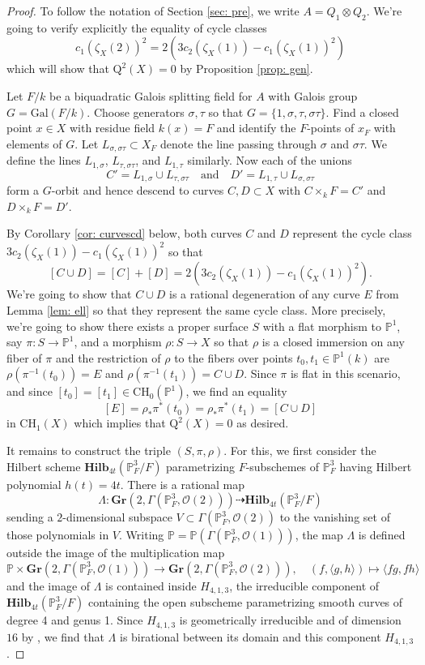 \documentclass[12pt]{amsart}
\theoremstyle{definition}
\newcommand{\CH}{\mathrm{CH}}
\newcommand{\Q}{\mathrm{Q}}
\newcommand{\Hilb}{\mathbf{Hilb}}
\begin{document}
\begin{proof}
To follow the notation of Section \ref{sec: pre}, we write $A=Q_1\otimes Q_2$. We're going to verify explicitly the equality of cycle classes \[c_1(\zeta_X(2))^2=2(3c_2(\zeta_X(1))-c_1(\zeta_X(1))^2)\] which will show that $\Q^2(X)=0$ by Proposition \ref{prop: gen}.

Let $F/k$ be a biquadratic Galois splitting field for $A$ with Galois group $G=\mathrm{Gal}(F/k)$. Choose generators $\sigma,\tau$ so that $G=\{1,\sigma,\tau,\sigma\tau\}$. Find a closed point $x\in X$ with residue field $k(x)=F$ and identify the $F$-points of $x_F$ with elements of $G$. Let $L_{\sigma,\sigma\tau}\subset X_F$ denote the line passing through $\sigma$ and $\sigma\tau$. We define the lines $L_{1,\sigma}$, $L_{\tau,\sigma\tau}$, and $L_{1,\tau}$ similarly. Now each of the unions \[ C'=L_{1,\sigma}\cup L_{\tau,\sigma\tau} \quad \mbox{and}\quad D'=L_{1,\tau}\cup L_{\sigma,\sigma\tau}\] form a $G$-orbit and hence descend to curves $C,D\subset X$ with $C\times_k F=C'$ and $D\times_k F=D'$.

By Corollary \ref{cor: curvescd} below, both curves $C$ and $D$ represent the cycle class $3c_2(\zeta_X(1))-c_1(\zeta_X(1))^2$ so that \[[C\cup D] = [C]+[D]=2(3c_2(\zeta_X(1))-c_1(\zeta_X(1))^2).\] We're going to show that $C\cup D$ is a rational degeneration of any curve $E$ from Lemma \ref{lem: ell} so that they represent the same cycle class. More precisely, we're going to show there exists a proper surface $S$ with a flat morphism to $\mathbb{P}^1$, say $\pi:S\rightarrow \mathbb{P}^1$, and a morphism $\rho:S\rightarrow X$ so that $\rho$ is a closed immersion on any fiber of $\pi$ and the restriction of $\rho$ to the fibers over points $t_0,t_1\in \mathbb{P}^1(k)$ are $\rho(\pi^{-1}(t_0))=E$ and $\rho(\pi^{-1}(t_1))=C\cup D$. Since $\pi$ is flat in this scenario, and since $[t_0]=[t_1]\in \CH_0(\mathbb{P}^1)$, we find an equality \[[E]=\rho_*\pi^*(t_0)=\rho_*\pi^*(t_1)=[C\cup D]\] in $\CH_1(X)$ which implies that $\Q^2(X)=0$ as desired.

It remains to construct the triple $(S,\pi,\rho)$. For this, we first consider the Hilbert scheme $\Hilb_{4t}(\mathbb{P}^3_F/F)$ parametrizing $F$-subschemes of $\mathbb{P}^3_F$ having Hilbert polynomial $h(t)=4t$. There is a rational map \[\Lambda:\mathbf{Gr}(2,\Gamma(\mathbb{P}^3_F,\mathcal{O}(2))) \dashrightarrow \Hilb_{4t}(\mathbb{P}^3_F/F)\] sending a $2$-dimensional subspace $V\subset \Gamma(\mathbb{P}^3_F,\mathcal{O}(2))$ to the vanishing set of those polynomials in $V$. Writing $\mathbb{P}=\mathbb{P}(\Gamma(\mathbb{P}^3_F,\mathcal{O}(1)))$, the map $\Lambda$ is defined outside the image of the multiplication map \[\mathbb{P}\times \mathbf{Gr}(2,\Gamma(\mathbb{P}^3_F,\mathcal{O}(1)))\rightarrow \mathbf{Gr}(2,\Gamma(\mathbb{P}^3_F,\mathcal{O}(2))),\quad (f,\langle g,h\rangle) \mapsto \langle fg,fh\rangle\] and the image of $\Lambda$ is contained inside $H_{4,1,3}$, the irreducible component of $\Hilb_{4t}(\mathbb{P}^3_F/F)$ containing the open subscheme parametrizing smooth curves of degree 4 and genus 1. Since $H_{4,1,3}$ is geometrically irreducible and of dimension $16$ by \cite[Theorem 8]{MR875083}, we find that $\Lambda$ is birational between its domain and this component $H_{4,1,3}$.


\end{proof}
\end{document}
